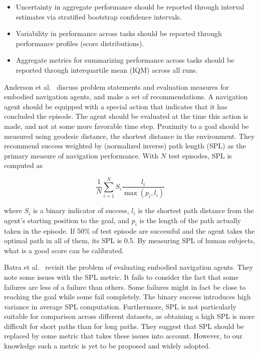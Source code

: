 \begin{itemize}
    \item Uncertainty in aggregate performance should be reported through interval estimates via stratified bootstrap confidence intervals.
    \item Variability in performance across tasks should be reported through performance profiles (score distributions).
    \item Aggregate metrics for summarizing performance across tasks should be reported through interquartile mean (IQM) across all runs.
\end{itemize}

Anderson et al.~\cite{anderson_evaluation_2018} discuss problem statements and evaluation measures for embodied navigation agents, and make a set of recommendations.
A navigation agent should be equipped with a special action that indicates that it has concluded the episode.
The agent should be evaluated at the time this action is made, and not at some more favorable time step. %
Proximity to a goal should be measured using geodesic distance, the shortest distance in the environment. %
They recommend success weighted by (normalized inverse) path length (SPL) as the primary measure of navigation performance.
With \(N\) test episodes, SPL is computed as 

\begin{equation}
    \frac{1}{N} \sum_{i=1}^N S_i \frac{l_i}{\max(p_i, l_i)}
\end{equation}


where \(S_i\) is a binary indicator of success,
\(l_i\) is the shortest path distance from the agent's starting position to the goal,
and \(p_i\) is the length of the path actually taken in the episode.
If 50\% of test episode are successful and the agent takes the optimal path in all of them, its SPL is 0.5.
By measuring SPL of human subjects, what is a good score can be calibrated.

Batra et al.~\cite{batra_evaluation_2020} revisit the problem of evaluating embodied navigation agents.
They note some issues with the SPL metric.
It fails to consider the fact that some failures are less of a failure than others.
Some failures might in fact be close to reaching the goal while some fail completely.
The binary success introduces high variance in average SPL computation.
Furthermore, SPL is not particularly suitable for comparison across different datasets,
as obtaining a high SPL is more difficult for short paths than for long paths.
They suggest that SPL should be replaced by some metric that takes these issues into account.
However, to our knowledge such a metric is yet to be proposed and widely adopted.